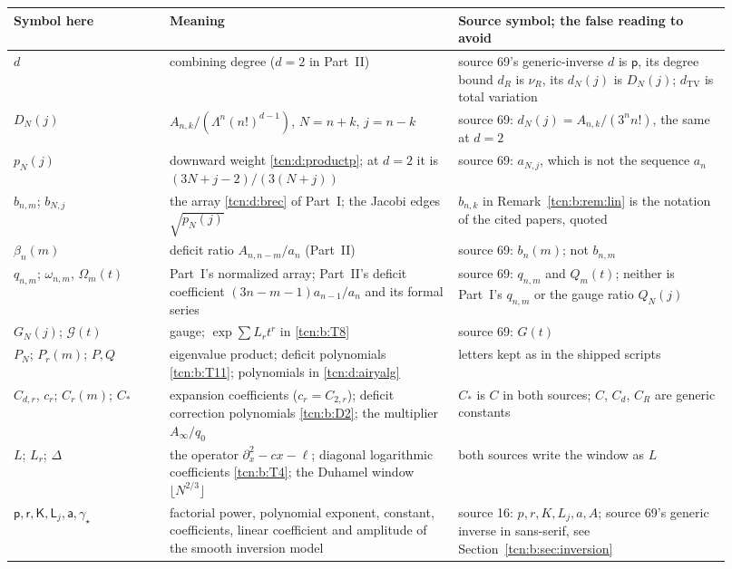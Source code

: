 \documentclass[11pt,letterpaper]{article}
\theoremstyle{remark}
\begin{document}
\begingroup\small
\begin{longtable}{@{}>{\raggedright}p{0.2\linewidth}>{\raggedright}p{0.37\linewidth}>{\raggedright\arraybackslash}p{0.35\linewidth}@{}}
\toprule
Symbol here & Meaning & Source symbol; the false reading to avoid\\
\midrule\endhead
$d$ & combining degree ($d=2$ in Part~II) & source 69's generic-inverse $d$ is $\mathsf p$, its degree bound $d_R$ is $\nu_R$, its $d_N(j)$ is $D_N(j)$; $d_{\mathrm{TV}}$ is total variation\\
$D_N(j)$ & $A_{n,k}/(\Lambda^n(n!)^{d-1})$, $N=n+k$, $j=n-k$ & source 69: $d_N(j)=A_{n,k}/(3^nn!)$, the same at $d=2$\\
$p_N(j)$ & downward weight \eqref{tcn:d:productp}; at $d=2$ it is $(3N+j-2)/(3(N+j))$ & source 69: $a_{N,j}$, which is not the sequence $a_n$\\
$b_{n,m}$; $b_{N,j}$ & the array \eqref{tcn:d:brec} of Part~I; the Jacobi edges $\sqrt{p_N(j)}$ & $b_{n,k}$ in Remark~\ref{tcn:b:rem:lin} is the notation of the cited papers, quoted\\
$\beta_n(m)$ & deficit ratio $A_{n,n-m}/a_n$ (Part~II) & source 69: $b_n(m)$; not $b_{n,m}$\\
$q_{n,m}$; $\omega_{n,m}$, $\Omega_m(t)$ & Part~I's normalized array; Part~II's deficit coefficient $(3n-m-1)a_{n-1}/a_n$ and its formal series & source 69: $q_{n,m}$ and $Q_m(t)$; neither is Part~I's $q_{n,m}$ or the gauge ratio $Q_N(j)$\\
$G_N(j)$; $\mathcal G(t)$ & gauge; $\exp\sum L_rt^r$ in \eqref{tcn:b:T8} & source 69: $G(t)$\\
$P_N$; $P_r(m)$; $P,Q$ & eigenvalue product; deficit polynomials \eqref{tcn:b:T11}; polynomials in \eqref{tcn:d:airyalg} & letters kept as in the shipped scripts\\
$C_{d,r}$, $c_r$; $C_r(m)$; $C_\ast$ & expansion coefficients ($c_r=C_{2,r}$); deficit correction polynomials \eqref{tcn:b:D2}; the multiplier $A_\infty/q_0$ & $C_\ast$ is $C$ in both sources; $C$, $C_d$, $C_R$ are generic constants\\
$L$; $L_r$; $\Delta$ & the operator $\partial_x^2-cx-\ell$; diagonal logarithmic coefficients \eqref{tcn:b:T4}; the Duhamel window $\lfloor N^{2/3}\rfloor$ & both sources write the window as $L$\\
$\mathsf p,\mathsf r,\mathsf K,\mathsf L_j,\mathsf a,\gamma_\star$ & factorial power, polynomial exponent, constant, coefficients, linear coefficient and amplitude of the smooth inversion model & source 16: $p,r,K,L_j,a,A$; source 69's generic inverse in sans-serif, see Section~\ref{tcn:b:sec:inversion}\\

\end{longtable}
\end{document}

